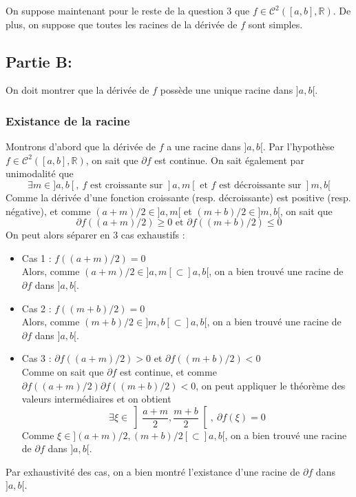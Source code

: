 \documentclass[a4paper, 12pt]{article}
\begin{document}
\newpage

On suppose maintenant pour le reste de la question 3 que \( f \in \mathcal{C}^{2}([a, b], \mathbb{R}) \). De plus, on suppose que toutes les racines de la dérivée de \( f \) sont simples.

\subsection{Partie B:}

On doit montrer que la dérivée de \( f \) possède une unique racine dans \( ]a, b[ \).

\subsubsection{Existance de la racine}

Montrons d'abord que la dérivée de \( f \) a une racine dans \( ]a, b[ \). Par l'hypothèse \( f \in \mathcal{C}^{2}([a, b], \mathbb{R}) \), on sait que \( \partial f \) est continue.
On sait également par unimodalité que
$$
\exists m \in ]a, b[,~ f \text{ est croissante sur } ]a, m[ \text{ et } f \text{ est décroissante sur } ]m, b[
$$
Comme la dérivée d'une fonction croissante (resp. décroissante) est positive (resp. négative), et comme \( (a+m)/2 \in ]a, m[ \) et \( (m+b)/2 \in ]m, b[ \), on sait que
$$
\partial f ((a+m)/2) \geq 0 \text{ et } \partial f((m+b)/2) \leq 0
$$
On peut alors séparer en 3 cas exhaustifs :
\begin{itemize}
    \item Cas 1 : \( f ((a+m)/2) = 0 \) \\
    Alors, comme \( (a+m)/2 \in ]a, m[ \subset ]a, b[ \), on a bien trouvé une racine de \( \partial f \) dans \( ]a, b[ \).
    \item Cas 2 : \( f ((m+b)/2) = 0 \) \\
    Alors, comme \( (m+b)/2 \in ]m, b[ \subset ]a, b[ \), on a bien trouvé une racine de \( \partial f \) dans \( ]a, b[ \).
    \item Cas 3 : \( \partial f ((a+m)/2) > 0 \) et \( \partial f((m+b)/2) < 0 \) \\
    Comme on sait que \( \partial f \) est continue, et comme \( \partial f ((a+m)/2) \partial f((m+b)/2) < 0 \), on peut appliquer le théorème des valeurs intermédiaires et on obtient
    $$
    \exists \xi \in \left] \frac{a+m}{2}, \frac{m+b}{2} \right[,~ \partial f (\xi) = 0
    $$
    Comme \( \xi \in ](a+m)/2, (m+b)/2[ \subset ]a, b[ \), on a bien trouvé une racine de \( \partial f \) dans \( ]a, b[ \).
\end{itemize}
Par exhaustivité des cas, on a bien montré l'existance d'une racine de \( \partial f \) dans \( ]a, b[ \).
\end{document}
